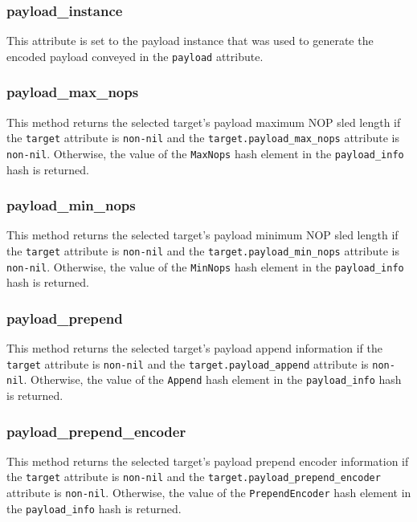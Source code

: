 \documentclass{report}
\begin{document}
            \subsubsection{payload\_instance}

\par
This attribute is set to the payload instance that was used to
generate the encoded payload conveyed in the \texttt{payload}
attribute.

            \subsubsection{payload\_max\_nops}

\par
This method returns the selected target's payload maximum NOP sled
length if the \texttt{target} attribute is \texttt{non-nil} and the
\texttt{target.payload\_max\_nops} attribute is \texttt{non-nil}.
Otherwise, the value of the \texttt{MaxNops} hash element in the
\texttt{payload\_info} hash is returned.

            \subsubsection{payload\_min\_nops}
\par
This method returns the selected target's payload minimum NOP sled
length if the \texttt{target} attribute is \texttt{non-nil} and the
\texttt{target.payload\_min\_nops} attribute is \texttt{non-nil}.
Otherwise, the value of the \texttt{MinNops} hash element in the
\texttt{payload\_info} hash is returned.

            \subsubsection{payload\_prepend}

\par
This method returns the selected target's payload append information
if the \texttt{target} attribute is \texttt{non-nil} and the
\texttt{target.payload\_append} attribute is \texttt{non-nil}.
Otherwise, the value of the \texttt{Append} hash element in the
\texttt{payload\_info} hash is returned.

            \subsubsection{payload\_prepend\_encoder}

\par
This method returns the selected target's payload prepend encoder
information if the \texttt{target} attribute is \texttt{non-nil} and
the \texttt{target.payload\_prepend\_encoder} attribute is
\texttt{non-nil}. Otherwise, the value of the
\texttt{PrependEncoder} hash element in the \texttt{payload\_info}
hash is returned.
\end{document}
